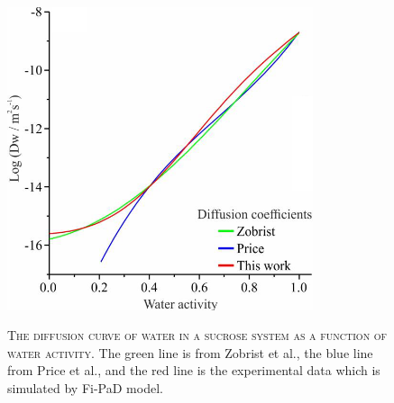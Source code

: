 \begin{figure}
    \centering
    \caption[The diffusion curve of water in a sucrose system as a function of water activity]{\textsc{The diffusion curve of water in a sucrose system as a function of water activity}. The green line is from Zobrist et al.\cite{C0CP01273D}, the blue line from Price et al.\cite{Price2014}, and the red line is the experimental data which is simulated by Fi-PaD model.}
    \includegraphics[width=0.8\textwidth]{chapters/water_hopping/figures/image058.png}
    \label{fig:wat_s11}
\end{figure}

